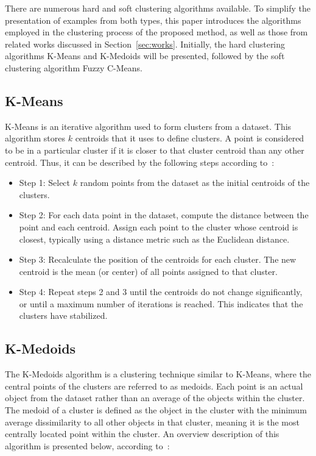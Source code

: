 \documentclass[a4paper,fleqn]{cas-dc}
\begin{document}
There are numerous hard and soft clustering algorithms available. To simplify the presentation of examples from both types, this paper introduces the algorithms employed in the clustering process of the proposed method, as well as those from related works discussed in Section~\ref{sec:works}. Initially, the hard clustering algorithms K-Means and K-Medoids will be presented, followed by the soft clustering algorithm Fuzzy C-Means.

\subsection{K-Means}

K-Means is an iterative algorithm used to form clusters from a dataset. This algorithm stores $k$ centroids that it uses to define clusters. A point is considered to be in a particular cluster if it is closer to that cluster centroid than any other centroid. Thus, it can be described by the following steps according to~\cite{yang2023unsupervised}:

\begin{itemize}
    \item Step 1: Select \( k \) random points from the dataset as the initial centroids of the clusters.
    
    \item Step 2: For each data point in the dataset, compute the distance between the point and each centroid. Assign each point to the cluster whose centroid is closest, typically using a distance metric such as the Euclidean distance.
    
    \item Step 3: Recalculate the position of the centroids for each cluster. The new centroid is the mean (or center) of all points assigned to that cluster.
    
    \item Step 4: Repeat steps 2 and 3 until the centroids do not change significantly, or until a maximum number of iterations is reached. This indicates that the clusters have stabilized.
\end{itemize}

\subsection{K-Medoids}

The K-Medoids algorithm is a clustering technique similar to K-Means, where the central points of the clusters are referred to as medoids. Each point is an actual object from the dataset rather than an average of the objects within the cluster. The medoid of a cluster is defined as the object in the cluster with the minimum average dissimilarity to all other objects in that cluster, meaning it is the most centrally located point within the cluster. An overview description of this algorithm is presented below, according to~\cite{gallardo2021clustering}:
\end{document}

